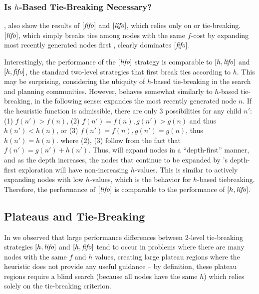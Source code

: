 \subsubsection{Is $h$-Based Tie-Breaking Necessary?}
\label{sec:h-necessary}
, also show the results of $[\mbox{\textit{fifo}}]$ and $[\mbox{\textit{lifo}}]$,
which relies only on \fifo or \lifo tie-breaking.
$[\mbox{\textit{lifo}}]$, which simply breaks ties among nodes with the same $f$-cost by expanding most recently generated nodes first \cite{korf1985depth}, clearly dominates $[\mbox{\textit{fifo}}]$.

Interestingly, the performance of the $[\mbox{\textit{lifo}}]$ strategy
is comparable to $[h,\mbox{\textit{lifo}}]$ and $[h,\mbox{\textit{fifo}}]$, the standard two-level strategies that first break ties according to $h$.
This may be surprising, considering the ubiquity of $h$-based tie-breaking in the search and planning communities.
% 
However, \lifo behaves somewhat similarly to $h$-based tie-breaking, in the following sense:
\lifo expandes the most recently generated node $n$.
If the heuristic function is admissible, there are only 3 possibilities for any child $n'$: 
(1) $f(n') > f(n)$, 
(2) $f(n') = f(n), g(n') > g(n)$ and thus $h(n') < h(n)$, or
(3) $f(n') = f(n), g(n') = g(n)$, thus $h(n') = h(n)$.
where (2), (3) follow from the fact that $f(n')=g(n')+h(n')$. %
Thus, \lifo will expand nodes in a ``depth-first'' manner, and as the depth increases,
the nodes that continue to be expanded by \lifo's 
depth-first exploration will have non-increasing $h$-values.
This is similar to actively expanding nodes with low $h$-values, which is the behavior for $h$-based tiebreaking.
Therefore, the performance of $[\mbox{\textit{lifo}}]$ is comparable to the performance of $[h,\mbox{\textit{lifo}}]$.


\subsection{Plateaus and Tie-Breaking}

In 
we observed that large performance differences between
2-level tie-breaking strategies $[h,\mbox{\textit{lifo}}]$ and $[h,\mbox{\textit{fifo}}]$ tend
to occur in problems where there are many nodes with the same $f$ and
$h$ values, creating large plateau regions where the heuristic does not
provide any useful guidance -- by definition, these plateau regions 
require a blind search (because all nodes
have the same $h$) which relies solely on the tie-breaking criterion.

